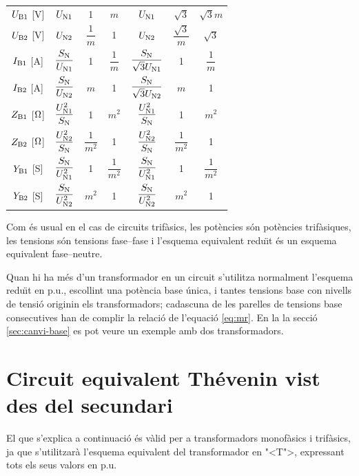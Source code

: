\begin{longtable}{ccccccc}
$U\ped{B1}$ [V] & $U\ped{N1}$ & 1 & $m$ & $U\ped{N1}$ & $\sqrt{3}$  & $\sqrt{3} m$\\[0.4cm]
$U\ped{B2}$ [V] & $U\ped{N2}$ & $\dfrac{1}{m}$ & 1 & $U\ped{N2}$ & $\dfrac{\sqrt{3}}{m}$ & $\sqrt{3}$ \\[0.4cm]
$I\ped{B1}$ [A] & $\dfrac{S\ped{N}}{U\ped{N1}}$ & 1 & $\dfrac{1}{m}$ & $\dfrac{S\ped{N}}{\sqrt{3}U\ped{N1}}$ & 1  & $\dfrac{1}{m}$\\[0.4cm]
$I\ped{B2}$ [A] & $\dfrac{S\ped{N}}{U\ped{N2}}$  & $m$ & 1 & $\dfrac{S\ped{N}}{\sqrt{3}U\ped{N2}}$   & $m$ & 1\\[0.4cm]
$Z\ped{B1}$ [$\ohm$]& $\dfrac{U\ped{N1}^2}{S\ped{N}}$ & 1 & $m^2$ & $\dfrac{U\ped{N1}^2}{S\ped{N}}$ & 1 & $m^2$\\[0.4cm]
$Z\ped{B2}$ [$\ohm$]& $\dfrac{U\ped{N2}^2}{S\ped{N}}$  & $\dfrac{1}{m^2}$ & 1& $\dfrac{U\ped{N2}^2}{S\ped{N}}$  & $\dfrac{1}{m^2}$ & 1\\[0.4cm]
$Y\ped{B1}$ [S]& $\dfrac{S\ped{N}}{U\ped{N1}^2}$ & 1 & $\dfrac{1}{m^2}$ & $\dfrac{S\ped{N}}{U\ped{N1}^2}$ & 1 & $\dfrac{1}{m^2}$ \\[0.4cm]
$Y\ped{B2}$ [S]& $\dfrac{S\ped{N}}{U\ped{N2}^2}$  & $m^2$ & 1 & $\dfrac{S\ped{N}}{U\ped{N2}^2}$ &$m^2$ &  1\\[0.4cm]
\bottomrule[1pt]
\end{longtable}

Com \'{e}s usual en el cas de circuits trif\`{a}sics, les pot\`{e}ncies s\'{o}n  pot\`{e}ncies trif\`{a}siques,  les tensions s\'{o}n  tensions fase--fase i l'esquema equivalent redu\"{\i}t \'{e}s un esquema equivalent fase--neutre.

Quan hi ha m\'{e}s d'un transformador en un circuit s'utilitza normalment l'esquema redu\"{\i}t en p.u., escollint una pot\`{e}ncia base \'{u}nica, i tantes tensions base con nivells de tensi\'{o}  originin els transformadors; cadascuna de les parelles de tensions base consecutives han de complir la relaci\'{o} de l'equaci\'{o} \eqref{eq:mr}. En la la secci\'{o} \vref{sec:canvi-base} es pot veure un exemple amb dos transformadors.

\section{Circuit equivalent Th\'{e}venin vist des del secundari}\label{sec:trafo-thevenin}

El que s'explica a continuaci\'{o} \'{e}s v\`{a}lid per a transformadors
monof\`{a}sics i trif\`{a}sics, ja que s'utilitzar\`{a} l'esquema equivalent del
transformador en {"<}T{">}, expressant tots els seus valors en p.u.

